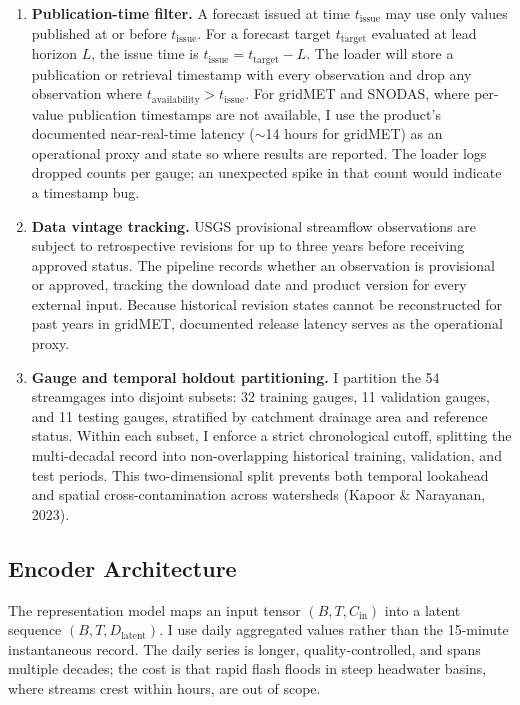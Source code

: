 \documentclass[12pt]{report}
\begin{document}
\begin{enumerate}
  \item \textbf{Publication-time filter.} A forecast issued at time $t_{\text{issue}}$ may use only values published at or before $t_{\text{issue}}$. For a forecast target $t_{\text{target}}$ evaluated at lead horizon $L$, the issue time is $t_{\text{issue}} = t_{\text{target}} - L$. The loader will store a publication or retrieval timestamp with every observation and drop any observation where $t_{\text{availability}} > t_{\text{issue}}$. For gridMET and SNODAS, where per-value publication timestamps are not available, I use the product's documented near-real-time latency ($\sim$14 hours for gridMET) as an operational proxy and state so where results are reported. The loader logs dropped counts per gauge; an unexpected spike in that count would indicate a timestamp bug.
  \item \textbf{Data vintage tracking.} USGS provisional streamflow observations are subject to retrospective revisions for up to three years before receiving approved status. The pipeline records whether an observation is provisional or approved, tracking the download date and product version for every external input. Because historical revision states cannot be reconstructed for past years in gridMET, documented release latency serves as the operational proxy.
  \item \textbf{Gauge and temporal holdout partitioning.} I partition the 54 streamgages into disjoint subsets: 32 training gauges, 11 validation gauges, and 11 testing gauges, stratified by catchment drainage area and reference status. Within each subset, I enforce a strict chronological cutoff, splitting the multi-decadal record into non-overlapping historical training, validation, and test periods. This two-dimensional split prevents both temporal lookahead and spatial cross-contamination across watersheds (Kapoor \& Narayanan, 2023).
\end{enumerate}

\subsection{Encoder Architecture}

The representation model maps an input tensor $(B, T, C_{\text{in}})$ into a latent sequence $(B, T, D_{\text{latent}})$. I use daily aggregated values rather than the 15-minute instantaneous record. The daily series is longer, quality-controlled, and spans multiple decades; the cost is that rapid flash floods in steep headwater basins, where streams crest within hours, are out of scope.
\end{document}
